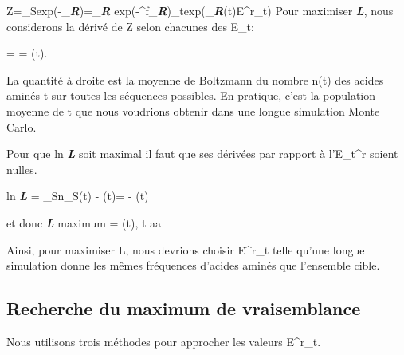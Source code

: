Z=\sum_Sexp(-\beta\DeltaG_\textit{\textbf{R}})=\sum_\textit{\textbf{R}} exp(-\beta\DeltaG^f_\textit{\textbf{R}})\prod_{t\inaa}exp(\betan_\textit{\textbf{R}}(t)E^r_t)
Pour maximiser \textit{\textbf{L}}, nous considerons la dérivé de Z selon chacunes des E_t:

=  = \langlen(t)\rangle.

La quantité à droite est la moyenne de Boltzmann du nombre n(t) des acides aminés t sur toutes les séquences possibles. En pratique, c'est la population moyenne de t que nous voudrions obtenir dans une longue simulation Monte Carlo. 

Pour que ln \textit{\textbf{L}} soit maximal il faut que ses dérivées par rapport à l'E_t^r soient nulles.

ln \textit{\textbf{L}} = \sum_Sn_S(t) - \langle(t)\rangle =  - \langlenn(t)\rangle

et donc
\textit{\textbf{L}} maximum  \Rightarrow {} = \langlenn(t)\rangle, \forall t \in aa

Ainsi, pour maximiser L, nous devrions choisir {E^r_t} telle qu'une longue simulation donne les mêmes fréquences d'acides aminés que l'ensemble cible.



\subsection{Recherche du maximum de vraisemblance}


Nous utilisons trois méthodes pour approcher les valeurs {E^r_t}.

